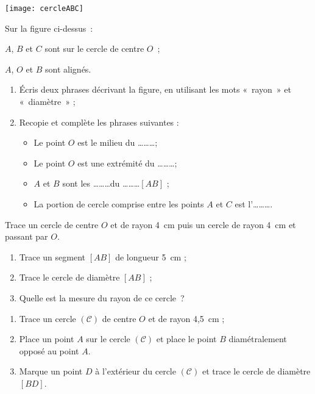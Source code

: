 

\begin{exercice}[Vocabulaire]
 \begin{center} \texttt{[image: cercleABC]} \end{center}
 Sur la figure ci-dessus : 
 
$A$, $B$ et $C$ sont sur le cercle de centre $O$ ;

$A$, $O$ et $B$ sont alignés.
 \begin{enumerate}
  \item Écris deux phrases décrivant la figure, en utilisant les mots « rayon » et « diamètre » ;
  \item Recopie et complète les phrases suivantes :
   \begin{itemize}
    \item Le point $O$ est le milieu du \ldots \ldots \ldots ;
    \item Le point $O$ est une extrémité du \ldots \ldots \ldots ;
    \item $A$ et $B$ sont les \ldots \ldots \ldots du \ldots \ldots \ldots $[AB]$ ;
    \item La portion de cercle comprise entre les points $A$ et $C$ est l'\ldots \ldots \ldots.
    \end{itemize}
  \end{enumerate}
\end{exercice}


\begin{exercice}
Trace un cercle de centre $O$ et de rayon 4 cm puis un cercle de rayon 4 cm et passant par $O$.
\end{exercice}


\begin{exercice}
 \begin{enumerate}
  \item Trace un segment $[AB]$ de longueur 5 cm ;
  \item Trace le cercle de diamètre $[AB]$ ;
  \item Quelle est la mesure du rayon de ce cercle ?
  \end{enumerate}
\end{exercice}


\begin{exercice}[Construction]
 \begin{enumerate}
  \item Trace un cercle $(\mathcal{C})$ de centre $O$ et de rayon 4,5 cm ;
  \item Place un point $A$ sur le cercle $(\mathcal{C})$ et place le point $B$ diamétralement opposé au point $A$.
  \item Marque un point $D$ à l'extérieur du cercle $(\mathcal{C})$ et trace le cercle de diamètre $[BD]$.
 \end{enumerate}
\end{exercice}


